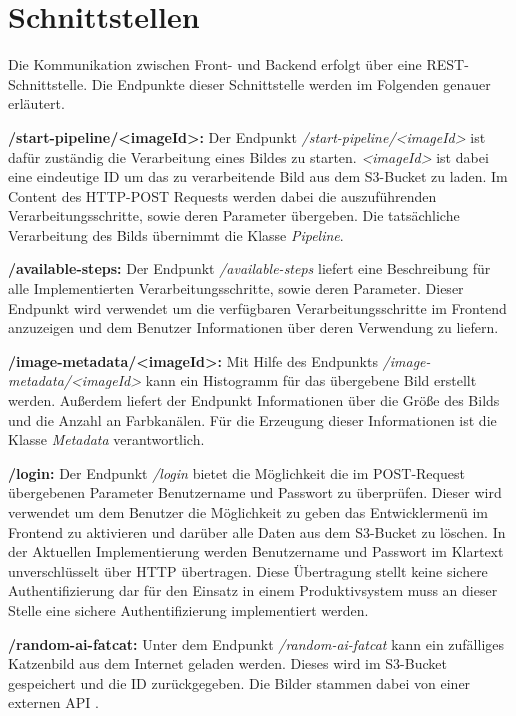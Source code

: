 \section{Schnittstellen}
\label{sec:schnittstellen}
Die Kommunikation zwischen Front- und Backend erfolgt über eine REST-Schnittstelle. Die Endpunkte dieser Schnittstelle werden im Folgenden genauer erläutert. 

\textbf{/start-pipeline/\textless imageId\textgreater: }Der Endpunkt \textit{/start-pipeline/\textless imageId\textgreater } ist dafür zuständig die Verarbeitung eines Bildes zu starten. \textit{\textless imageId\textgreater  } ist dabei eine eindeutige ID um das zu verarbeitende Bild aus dem S3-Bucket zu laden. Im Content des HTTP-POST Requests werden dabei die auszuführenden Verarbeitungsschritte, sowie deren Parameter übergeben. Die tatsächliche Verarbeitung des Bilds übernimmt die Klasse \textit{Pipeline}.

\textbf{/available-steps: }Der Endpunkt \textit{/available-steps} liefert eine Beschreibung für alle Implementierten Verarbeitungsschritte, sowie deren Parameter. Dieser Endpunkt wird verwendet um die verfügbaren Verarbeitungsschritte im Frontend anzuzeigen und dem Benutzer Informationen über deren Verwendung zu liefern.

\textbf{/image-metadata/\textless imageId\textgreater: }Mit Hilfe des Endpunkts \textit{/image-metadata/\textless imageId\textgreater } kann ein Histogramm für das übergebene Bild erstellt werden. Außerdem liefert der Endpunkt Informationen über die Größe des Bilds und die Anzahl an Farbkanälen. Für die Erzeugung dieser Informationen ist die Klasse \textit{Metadata} verantwortlich.

\textbf{/login: }Der Endpunkt \textit{/login} bietet die Möglichkeit die im POST-Request übergebenen Parameter Benutzername und Passwort zu überprüfen. Dieser wird verwendet um dem Benutzer die Möglichkeit zu geben das Entwicklermenü im Frontend zu aktivieren und darüber alle Daten aus dem S3-Bucket zu löschen. In der Aktuellen Implementierung werden Benutzername und Passwort im Klartext unverschlüsselt über HTTP übertragen. Diese Übertragung stellt keine sichere Authentifizierung dar für den Einsatz in einem Produktivsystem muss an dieser Stelle eine sichere Authentifizierung implementiert werden.

\textbf{/random-ai-fatcat: }Unter dem Endpunkt \textit{/random-ai-fatcat} kann ein zufälliges Katzenbild aus dem Internet geladen werden. Dieses wird im S3-Bucket gespeichert und die ID zurückgegeben. Die Bilder stammen dabei von einer externen API \cite{catapi}. 
